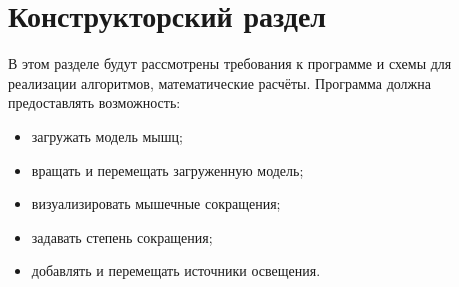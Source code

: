 \chapter{Конструкторский раздел}
\label{cha:design}
В этом разделе будут рассмотрены требования к программе и схемы для реализации алгоритмов, математические расчёты.
Программа должна предоставлять возможность:
\begin{itemize}
	\item загружать модель мышц;
	\item вращать и перемещать загруженную модель;
	\item визуализировать мышечные сокращения;
	\item задавать степень сокращения;
	\item добавлять и перемещать источники освещения.
\end{itemize}

